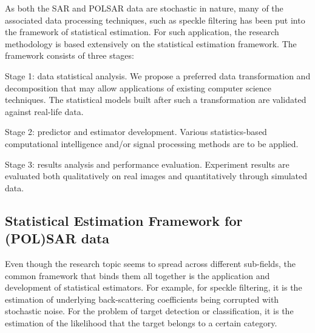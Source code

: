   
As both the SAR and POLSAR data are stochastic in nature, many of the associated data processing techniques, such as speckle filtering has been put into the framework of statistical estimation.
For such application, the research methodology is based extensively on the statistical estimation framework. 
The framework consists of three stages:

\begin{description}
\item{Stage 1:} data statistical analysis. 
We propose a preferred data transformation and decomposition that may allow applications of existing computer science techniques. 
The statistical models built after such a transformation are validated against real-life data.
\item{Stage 2:} predictor and estimator development.
Various statistics-based computational intelligence and/or signal processing methods are to be applied. 
\item{Stage 3:} results analysis and performance evaluation.
Experiment results are evaluated both qualitatively on real images and quantitatively through simulated data. 
\end{description}

\subsection{Statistical Estimation Framework for (POL)SAR data}

Even though the research topic seems to spread across different sub-fields, the common framework that binds them all together is the application and development of statistical estimators.
For example, for speckle filtering, it is the estimation of underlying back-scattering coefficients being corrupted with stochastic noise.
For the problem of target detection or classification,
  it is the estimation of the likelihood that the target belongs to a certain category.

